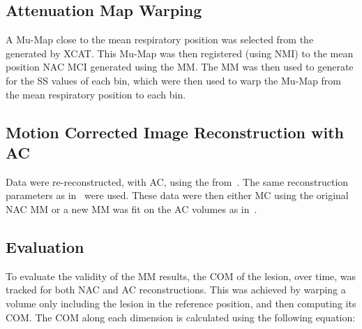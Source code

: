             \subsection{Attenuation Map Warping} \label{sec:pet_ct_respiratory_motion_correction_with_a_single_attenuation_map_using_nac_derived_deformation_fields_methods_attenuation_map_warping}
                A \gls{Mu-Map} close to the mean respiratory position was selected from the  generated by \gls{XCAT}. This \gls{Mu-Map} was then registered (using \gls{NMI}) to the mean position \gls{NAC} \gls*{MCI} generated using the \gls{MM}. The \gls{MM} was then used to generate  for the \gls{SS} values of each bin, which were then used to warp the \gls{Mu-Map} from the mean respiratory position to each bin.
            
            \subsection{Motion Corrected Image Reconstruction with AC} \label{sec:pet_ct_respiratory_motion_correction_with_a_single_attenuation_map_using_nac_derived_deformation_fields_methods_attenuation_corrected_image_reconstruction}
                Data were re-reconstructed, with \gls{AC}, using the  from~. The same reconstruction parameters as in~ were used. These data were then either \gls{MC} using the original \gls{NAC} \gls{MM} or a new \gls{MM} was fit on the \gls{AC} volumes as in~.
            
            \subsection{Evaluation} \label{sec:pet_ct_respiratory_motion_correction_with_a_single_attenuation_map_using_nac_derived_deformation_fields_methods_evaluation}
                To evaluate the validity of the \gls{MM} results, the \gls{COM} of the lesion, over time, was tracked for both \gls{NAC} and \gls{AC} reconstructions. This was achieved by warping a volume only including the lesion in the reference position, and then computing its \gls{COM}. The \gls{COM} along each dimension is calculated using the following equation:
                
